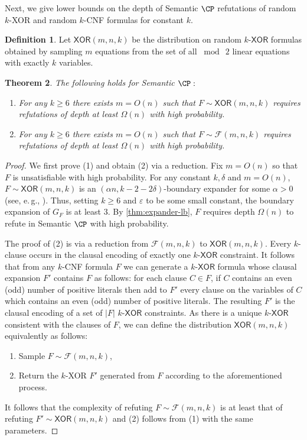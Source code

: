 \documentclass[11pt]{article}
\numberwithin{equation}{section}
\newtheorem{theorem}{Theorem}[section]
\theoremstyle{definition}
\newtheorem{definition}[theorem]{Definition}
\theoremstyle{plain}
\newcommand{\eg}{e.\,g.}
\newcounter{cor}\renewcommand{\thecor}{1.1.\arabic{cor}}\newenvironment{cor}{\ifnum\value{cor}=0\refstepcounter{cor}\else\PackageError{toc-native-compat}{Unsupported additional cor envelope}{Only the one exact source-observed cor paragraph is allowed.}\fi}{}\providecommand{\corautorefname}{Theorem}
\newcommand{\XOR}{\ensuremath{\mathsf{XOR}}}
\begin{document}
Next, we give lower bounds on the depth of Semantic $\CP$ refutations of random $k$-XOR and random $k$-CNF formulas for constant $k$.
\begin{definition}
	Let $\XOR(m,n,k)$ be the distribution on random $k$-$\XOR$ formulas obtained by sampling $m$ equations from the set of all $\bmod\ 2$ linear equations with exactly $k$ variables.
\end{definition}
\begin{theorem}\label{thm:randomLB}
The following holds for Semantic $\CP:$
	\begin{enumerate}
		\item[$1$.] For any $k \geq 6$ there exists $m = O(n)$ such that $F \sim \XOR(m,n,k)$ requires refutations of depth at least $\Omega(n)$ with high probability.
		\item[$2$.] For any $k \geq 6$ there exists $m = O(n)$ such that $F \sim \mathcal{F}(m,n,k)$ requires refutations of depth at least $\Omega(n)$ with high probability.
	\end{enumerate}
\end{theorem}
%
\begin{proof}
	We first prove (1) and obtain (2) via a reduction. 
	Fix $m= O(n)$ so that $F$ is unsatisfiable with high probability. 
	For any constant $k,\delta$ and $m=O(n)$,  $F \sim \XOR(m,n,k)$ is an $(\alpha n, k-2-2\delta)$-boundary expander for some $\alpha > 0$ (see, \eg, \cite{BGHMP06,cs-resolution}). 
	Thus, setting $k \geq 6$ and $\varepsilon$ to be some small constant, the boundary expansion of $G_F$ is at least $3$. 
	By \autoref{thm:expander-lb}, $F$ requires depth $\Omega(n)$ to refute in Semantic $\CP$ with high probability.
	
	The proof of (2) is via a reduction from $\mathcal{F}(m,n,k)$ to $\XOR(m,n,k)$. 
	Every $k$-clause occurs in the clausal encoding of exactly one $k$-$\XOR$ constraint. 
	It follows that from any $k$-CNF formula $F$ we can generate a $k$-$\XOR$ formula whose clausal expansion $F'$ contains $F$ as follows:
	for each clause $C \in F$, if $C$ contains an even (odd) number of positive literals then add to $F'$ every clause on the variables of $C$ which contains an even (odd) number of positive literals. The resulting $F'$ is the clausal encoding of a set of $|F|$ $k$-$\XOR$ constraints. As there is a unique $k$-$\XOR$ consistent with the clauses of $F$, we can define the distribution $\XOR(m,n,k)$ equivalently as follows: 
	\begin{enumerate}
		\item Sample $F \sim \mathcal{F}(m,n,k)$,
		\item Return the $k$-XOR $F'$ generated from $F$ according to the aforementioned process.
	\end{enumerate}
	It follows that the complexity of refuting $F \sim \mathcal{F}(m,n,k)$ is at least that of refuting $F' \sim \XOR(m,n,k)$ and (2) follows from (1) with the same parameters. 
\end{proof}
\end{document}
